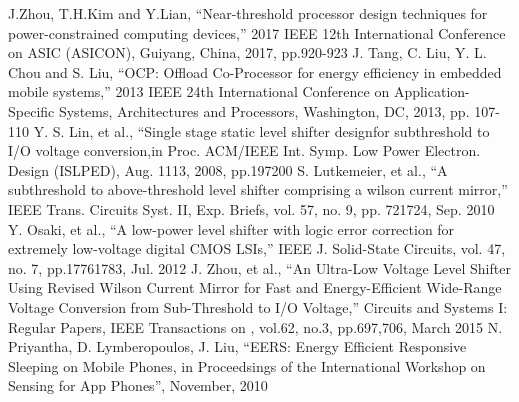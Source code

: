 \documentclass[conference]{IEEEtran}
\begin{document}
\begin{thebibliography}{00}
 J.Zhou, T.H.Kim and Y.Lian, ``Near-threshold processor design techniques for power-constrained 
computing devices,'' 2017 IEEE 12th International Conference on ASIC (ASICON), Guiyang, China, 2017, pp.920-923
 J. Tang, C. Liu, Y. L. Chou and S. Liu, ``OCP: Offload Co-Processor
for energy efficiency in embedded mobile systems,'' 2013 IEEE 24th International Conference on Application-Specific 
Systems, Architectures and Processors, Washington, DC, 2013, pp. 107-110
 Y. S. Lin, et al., ``Single stage static level shifter designfor subthreshold to I/O voltage conversion,in Proc. ACM/IEEE Int. Symp. Low Power Electron. Design (ISLPED), Aug. 1113, 2008, pp.197200
 S. Lutkemeier, et al., ``A subthreshold to above-threshold level shifter comprising a wilson current mirror,'' IEEE Trans. Circuits Syst. II, Exp. Briefs, vol. 57, no. 9, pp. 721724, Sep. 2010
 Y. Osaki, et al., ``A low-power level shifter with logic error correction for extremely low-voltage digital CMOS LSIs,'' IEEE J. Solid-State Circuits, vol. 47, no. 7, pp.17761783, Jul. 2012
 J. Zhou, et al., ``An Ultra-Low Voltage Level Shifter Using Revised Wilson Current Mirror for Fast and Energy-Efficient Wide-Range Voltage Conversion from Sub-Threshold to I/O Voltage,'' Circuits and Systems I: Regular Papers, IEEE Transactions on , vol.62, no.3, pp.697,706, March 2015
 N. Priyantha, D. Lymberopoulos, J. Liu, ``EERS: Energy Efficient Responsive Sleeping on Mobile Phones, in Proceedsings of the International Workshop on Sensing for App Phones'', November, 2010
\end{thebibliography}
\end{document}
